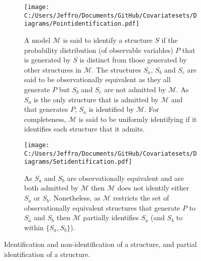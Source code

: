 \documentclass[10pt,a4paper,twoside]{article}
\numberwithin{equation}{subsection}
\begin{document}
\begin{figure}[p]
\centering
\begin{subfigure}{0.8\textwidth}
  \centering
  \texttt{[image: C:/Users/Jeffro/Documents/GitHub/Covariatesets/Diagrams/Pointidentification.pdf]}
  \caption{A model $\mathcal{M}$ is said to identify a structure $S$ if the probability distribution (of observable variables) $P$ that is generated by $S$ is distinct from those generated by other structures in $\mathcal{M}$. The structures $S_a$, $S_b$ and $S_c$ are said to be observationally equivalent as they all generate $P$ but $S_b$ and $S_c$ are not admitted by $\mathcal{M}$. As $S_a$ is the only structure that is admitted by $\mathcal{M}$ and that generates $P$, $S_a$ is identified by $\mathcal{M}$. For completeness, $\mathcal{M}$ is said to be uniformly identifying if it identifies each structure that it admits.}
  \label{fig:identify}
  \end{subfigure}
  \begin{subfigure}{0.8\textwidth}
  \centering
  \texttt{[image: C:/Users/Jeffro/Documents/GitHub/Covariatesets/Diagrams/Setidentification.pdf]}
  \caption{As $S_a$ and $S_b$ are observationally equivalent and are both admitted by $\mathcal{M}$ then $\mathcal{M}$ does not identify either $S_a$ or $S_b$. Nonetheless, as $\mathcal{M}$ restricts the set of observationally equivalent structures that generate $P$ to $S_a$ and $S_b$ then $\mathcal{M}$ partially identifies $S_a$ (and $S_b$ to within $\lbrace S_a,S_b\rbrace$).}
  \label{fig:partial}
  \end{subfigure}
\caption{Identification and non-identification of a structure, and partial identification of a structure.}
\label{fig:identification}
\end{figure}
\end{document}
